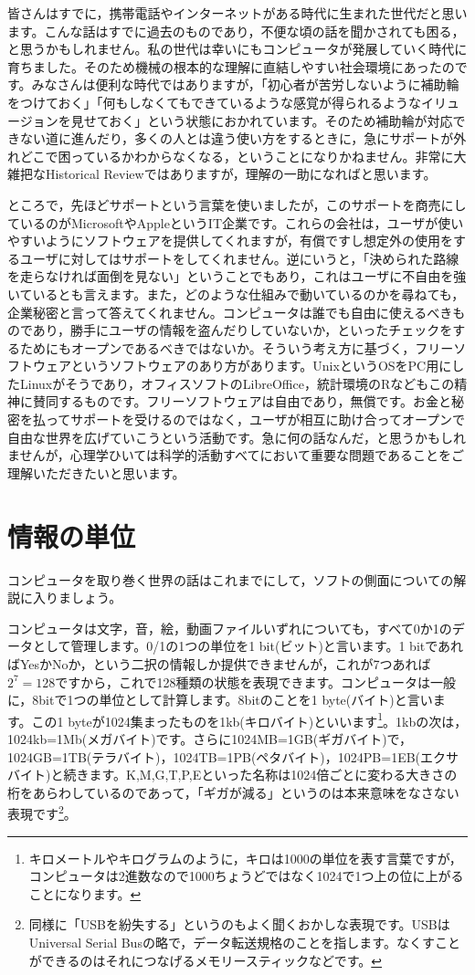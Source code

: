 \documentclass{ltjsbook}
\begin{document}
皆さんはすでに，携帯電話やインターネットがある時代に生まれた世代だと思います。こんな話はすでに過去のものであり，不便な頃の話を聞かされても困る，と思うかもしれません。私の世代は幸いにもコンピュータが発展していく時代に育ちました。そのため機械の根本的な理解に直結しやすい社会環境にあったのです。みなさんは便利な時代ではありますが，「初心者が苦労しないように補助輪をつけておく」「何もしなくてもできているような感覚が得られるようなイリュージョンを見せておく」という状態におかれています。そのため補助輪が対応できない道に進んだり，多くの人とは違う使い方をするときに，急にサポートが外れどこで困っているかわからなくなる，ということになりかねません。非常に大雑把なHistorical Reviewではありますが，理解の一助になればと思います。

ところで，先ほどサポートという言葉を使いましたが，このサポートを商売にしているのがMicrosoftやAppleというIT企業です。これらの会社は，ユーザが使いやすいようにソフトウェアを提供してくれますが，有償ですし想定外の使用をするユーザに対してはサポートをしてくれません。逆にいうと，「決められた路線を走らなければ面倒を見ない」ということでもあり，これはユーザに不自由を強いているとも言えます。また，どのような仕組みで動いているのかを尋ねても，企業秘密と言って答えてくれません。コンピュータは誰でも自由に使えるべきものであり，勝手にユーザの情報を盗んだりしていないか，といったチェックをするためにもオープンであるべきではないか。そういう考え方に基づく，フリーソフトウェアというソフトウェアのあり方があります。UnixというOSをPC用にしたLinuxがそうであり，オフィスソフトのLibreOffice，統計環境のRなどもこの精神に賛同するものです。フリーソフトウェアは自由であり，無償です。お金と秘密を払ってサポートを受けるのではなく，ユーザが相互に助け合ってオープンで自由な世界を広げていこうという活動です。急に何の話なんだ，と思うかもしれませんが，心理学ひいては科学的活動すべてにおいて重要な問題であることをご理解いただきたいと思います。

\section{情報の単位}
コンピュータを取り巻く世界の話はこれまでにして，ソフトの側面についての解説に入りましょう。

コンピュータは文字，音，絵，動画ファイルいずれについても，すべて0か1のデータとして管理します。0/1の1つの単位を1 bit(ビット)と言います。1 bitであればYesかNoか，という二択の情報しか提供できませんが，これが7つあれば$2^7=128$ですから，これで128種類の状態を表現できます。コンピュータは一般に，8bitで1つの単位として計算します。8bitのことを1 byte(バイト)と言います。この1 byteが1024集まったものを1kb(キロバイト)といいます\footnote{キロメートルやキログラムのように，キロは1000の単位を表す言葉ですが，コンピュータは2進数なので1000ちょうどではなく1024で1つ上の位に上がることになります。}。1kbの次は，1024kb=1Mb(メガバイト)です。さらに1024MB=1GB(ギガバイト)で，1024GB=1TB(テラバイト)，1024TB=1PB(ペタバイト)，1024PB=1EB(エクサバイト)と続きます。K,M,G,T,P,Eといった名称は1024倍ごとに変わる大きさの桁をあらわしているのであって，「ギガが減る」というのは本来意味をなさない表現です\footnote{同様に「USBを紛失する」というのもよく聞くおかしな表現です。USBはUniversal Serial Busの略で，データ転送規格のことを指します。なくすことができるのはそれにつなげるメモリースティックなどです。}。
\end{document}

